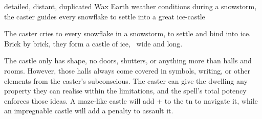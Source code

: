  {detailed, distant, duplicated}%
  {Wax}%
  {Earth}%
  {weather conditions}%
  {during a snowstorm, the caster guides every snowflake to settle into a great ice-castle}%
  {
    The caster cries to every snowflake in a snowstorm, to settle and bind into ice.
    Brick by brick, they form a castle of ice, \spellArea\ wide and long.

    The castle only has shape, no doors, shutters, or anything more than halls and rooms.
    However, those halls always come covered in symbols, writing, or other elements from the caster's subconscious.
    The caster can give the dwelling any property they can realise within the limitations, and the spell's total potency enforces those ideas.
    A maze-like castle will add + to the \gls{tn} to navigate it, while an impregnable castle will add a penalty to assault it.
  }

